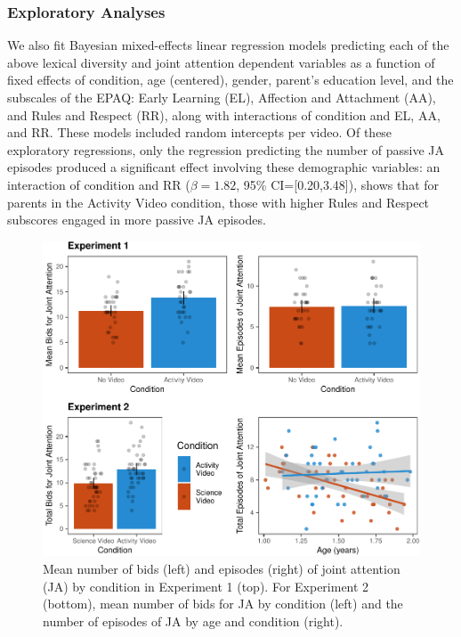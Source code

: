 \documentclass[man,floatsintext]{apa6}
\begin{document}
\hypertarget{exploratory-analyses}{%
\subsubsection{Exploratory Analyses}\label{exploratory-analyses}}

We also fit Bayesian mixed-effects linear regression models predicting each of the above lexical diversity and joint attention dependent variables as a function of fixed effects of condition, age (centered), gender, parent's education level, and the subscales of the EPAQ: Early Learning (EL), Affection and Attachment (AA), and Rules and Respect (RR), along with interactions of condition and EL, AA, and RR.
These models included random intercepts per video.
Of these exploratory regressions, only the regression predicting the number of passive JA episodes produced a significant effect involving these demographic variables: an interaction of condition and RR (\(\beta=1.82\), 95\% CI={[}0.20,3.48{]}), shows that for parents in the Activity Video condition, those with higher Rules and Respect subscores engaged in more passive JA episodes.

\begin{figure}[H]

{\centering \includegraphics{figs/fig-JA-1} 

}

\caption{\label{fig:JA} Mean number of bids (left) and episodes (right) of joint attention (JA) by condition in Experiment 1 (top). For Experiment 2 (bottom), mean number of bids for JA by condition (left) and the number of episodes of JA by age and condition (right).}\label{fig:fig-JA}
\end{figure}
\end{document}
